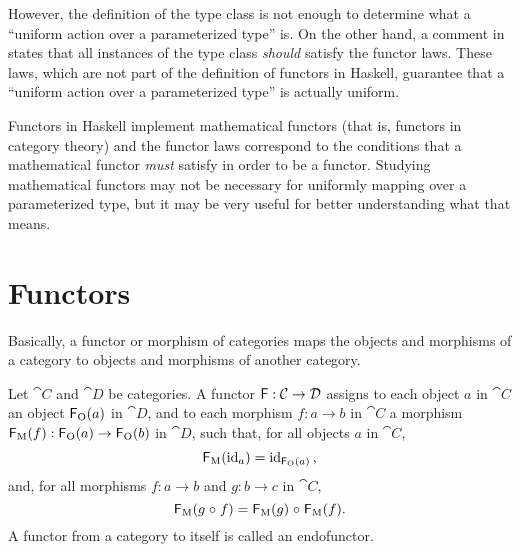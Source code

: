 However, the definition of the  type class is not
enough to determine what a ``uniform action over a parameterized
type'' is. On the other hand, a comment in \parencite[p.
  88]{peytonjones-2003} states that all instances of the
 type class \emph{should} satisfy the functor
laws. These laws, which are not part of the definition of functors in
Haskell, guarantee that a ``uniform action over a parameterized type''
is actually uniform.

Functors in Haskell implement mathematical functors (that is, functors
in category theory) and the functor laws correspond to the conditions
that a mathematical functor \emph{must} satisfy in order to be a
functor. Studying mathematical functors may not be necessary for
uniformly mapping over a parameterized type, but it may be very useful
for better understanding what that means.

\section{Functors}
\label{sec:functors}

Basically, a functor or morphism of categories maps the objects and
morphisms of a category to objects and morphisms of another category.

\begin{definition}
  \label{def:functor}


  Let $\cat{C}$ and $\cat{D}$ be categories. A functor $\mathsf{F}:
  \mathcal{C} \to \mathcal{D}$ assigns to each object $a$ in $\cat{C}$ an
  object $\mathsf{F}_{\operatorname{O}}(a)$ in $\cat{D}$, and to each morphism $f: a \to
  b$ in $\cat{C}$ a morphism $\mathsf{F}_{\operatorname{M}}(f): \mathsf{F}_{\operatorname{O}}(a) \to
  \mathsf{F}_{\operatorname{O}}(b)$ in $\cat{D}$, such that, for all objects $a$ in
  $\cat{C}$,
  \begin{equation}
    \label{eq:functor-identity}
    \mathsf{F}_{\operatorname{M}}(\operatorname{id}_{a}) = \operatorname{id}_{\mathsf{F}_{\operatorname{O}}(a)}
    \text{,}
  \end{equation}
  and, for all morphisms $f: a \to b$ and $g: b \to c$ in $\cat{C}$,
  \begin{equation}
    \label{eq:functor-composition}
    \mathsf{F}_{\operatorname{M}}(g \mathrel{\circ} f) = \mathsf{F}_{\operatorname{M}}(g) \mathrel{\circ} \mathsf{F}_{\operatorname{M}}(f)
    \text{.}
  \end{equation}
  A functor from a category to itself is called an endofunctor.

\end{definition}


